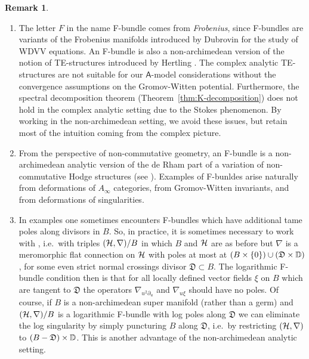 \documentclass[twoside,leqno]{article}
\numberwithin{equation}{section}
\theoremstyle{plain}
\theoremstyle{definition}
\newtheorem{remark}[equation]{Remark}
\begin{document}
\begin{remark} \label{rem:F-bundle}
\begin{enumerate}[wide]
\item[(i)] The letter $F$ in the name F-bundle comes from \emph{Frobenius}, since F-bundles are variants of the Frobenius manifolds introduced by Dubrovin \cite{Dubrovin_Geometry_of_2D} for the study of WDVV equations. An F-bundle is also a non-archimedean version of the notion of TE-structures introduced by Hertling \cite{hertling_tt*_geometry}. The complex analytic TE-structures are not suitable for our $\mathsf{A}$-model considerations without the convergence assumptions on the Gromov-Witten potential. Furthermore, the spectral decomposition theorem (Theorem~\ref{thm:K-decomposition}) does not hold in the complex analytic setting due to the Stokes phenomenon.
By working in the non-archimedean setting, we avoid these issues, but retain most of the intuition coming  from the complex picture.

\item[(ii)] From the perspective of non-commutative geometry, an F-bundle is a non-archimedean analytic version of the de Rham part of a variation of non-commutative Hodge structures (see \cite[\S2.1.5,\S2.3.1]{Katzarkov_Hodge_theoretic_aspects}).
Examples of F-bunldes arise naturally from deformations of
$A_\infty$ categories, from Gromov-Witten invariants, and from deformations of singularities.

\item[(iii)] In examples one sometimes  encounters  F-bundles which have additional tame poles along divisors in $B$. So, in practice, it is sometimes necessary to work with , i.e.\  with triples  $(\mathcal H,\nabla)/B$ in which $B$ and $\mathcal H$ are as before but $\nabla$ is a meromorphic flat connection on $\mathcal H$ with poles at  most at $(B\times \{0\})\cup (\mathfrak{D}\times \mathbb D)$, for some even strict normal crossings divisor $\mathfrak{D} \subset B$. The logarithmic  F-bundle condition then is that for all locally defined vector fields $\xi$ on $B$ which are tangent to $\mathfrak{D}$ the operators  $\nabla_{u^2\partial_u}$ and $\nabla_{u\xi}$ should have no poles. Of course, if $B$ is a non-archimedean super manifold (rather than a germ) and $(\mathcal H,\nabla)/B$ is a logarithmic F-bundle with log poles along $\mathfrak{D}$ we can eliminate the log singularity by simply puncturing $B$ along $\mathfrak{D}$, i.e.\  by restricting  $(\mathcal H, \nabla)$ to $(B - \mathfrak{D})\times \mathbb D$. This is another advantage of the non-archimedean analytic setting.
\end{enumerate}
\end{remark}
\end{document}
